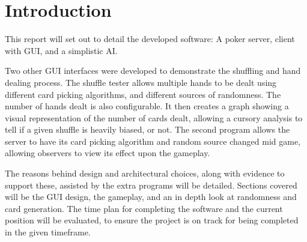 \section{Introduction}
This report will set out to detail the developed software: A poker server,
client with GUI, and a simplistic AI\@. 

Two other GUI interfaces were developed to demonstrate the shuffling and
hand dealing process. The shuffle tester allows multiple hands to be dealt 
using different card picking algorithms, and different sources of randomness.
The number of hands dealt is also configurable. It then creates a graph 
showing a visual representation of the number of cards dealt, allowing a
cursory analysis to tell if a given shuffle is heavily biased, or not.
The second program allows the server to have its card picking algorithm
and random source changed mid game, allowing observers to view its effect
upon the gameplay.

The reasons behind design and architectural choices, along with evidence to 
support these, assisted by the extra programs will be detailed. Sections 
covered  will be the GUI design, the gameplay, and an in depth look at 
randomness and card generation. The time plan for completing the software
and the current position will be evaluated, to ensure the project is on
track for being completed in the given timeframe.
